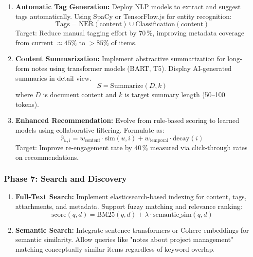 \documentclass[10pt,twocolumn,a4paper]{article}
\begin{document}
\begin{table}[h]
\begin{enumerate}

\item \textbf{Automatic Tag Generation:} Deploy NLP models to extract and suggest tags
  automatically. Using SpaCy or TensorFlow.js for entity recognition:
  \begin{equation}
    \text{Tags} = \text{NER}(\text{content}) \cup \text{Classification}(\text{content})
  \end{equation}
  Target: Reduce manual tagging effort by 70\,\%, improving metadata coverage from current
  $\approx 45\%$ to $>85\%$ of items.

\item \textbf{Content Summarization:} Implement abstractive summarization for long-form notes
  using transformer models (BART, T5). Display AI-generated summaries in detail view.
  \begin{equation}
    S = \text{Summarize}(D, k)
  \end{equation}
  where $D$ is document content and $k$ is target summary length (50--100 tokens).

\item \textbf{Enhanced Recommendation:} Evolve from rule-based scoring to learned models using
  collaborative filtering. Formulate as:
  \begin{equation}
    \hat{r}_{u,i} = w_{\text{content}} \cdot \text{sim}(u, i) + w_{\text{temporal}} \cdot
    \text{decay}(i)
  \end{equation}
  Target: Improve re-engagement rate by 40\,\% measured via click-through rates on
  recommendations.

\end{enumerate}

\subsubsection{Phase 7: Search and Discovery}

\begin{enumerate}

\item \textbf{Full-Text Search:} Implement elasticsearch-based indexing for content, tags,
  attachments, and metadata. Support fuzzy matching and relevance ranking:
  \begin{equation}
    \text{score}(q, d) = \text{BM25}(q, d) + \lambda \cdot \text{semantic\_sim}(q, d)
  \end{equation}

\item \textbf{Semantic Search:} Integrate sentence-transformers or Cohere embeddings for
  semantic similarity. Allow queries like "notes about project management" matching
  conceptually similar items regardless of keyword overlap.


\end{enumerate}
\end{table}
\end{document}
